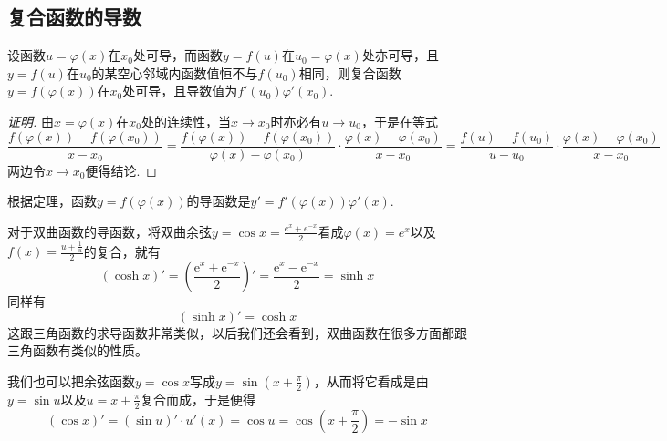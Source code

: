 \subsection{复合函数的导数}
\label{sec:derivative-of-embed-function}

\begin{theorem}
  设函数$u=\varphi(x)$在$x_0$处可导，而函数$y=f(u)$在$u_0=\varphi(x)$处亦可导，且$y=f(u)$在$u_0$的某空心邻域内函数值恒不与$f(u_0)$相同，则复合函数$y=f(\varphi(x))$在$x_0$处可导，且导数值为$f'(u_0)\varphi '(x_0)$.
\end{theorem}

\begin{proof}[证明]
  由$x=\varphi(x)$在$x_0$处的连续性，当$x \to x_0$时亦必有$u \to u_0$，于是在等式
  \[ \frac{f(\varphi(x))-f(\varphi(x_0))}{x-x_0} = \frac{f(\varphi(x))-f(\varphi(x_0))}{\varphi(x)-\varphi(x_0)} \cdot \frac{\varphi(x)-\varphi(x_0)}{x-x_0} = \frac{f(u)-f(u_0)}{u-u_0} \cdot \frac{\varphi(x)-\varphi(x_0)}{x-x_0} \]
  两边令$x \to x_0$便得结论.
\end{proof}

根据定理，函数$y=f(\varphi(x))$的导函数是$y'=f'(\varphi(x))\varphi '(x)$.

\begin{example}
  对于双曲函数的导函数，将双曲余弦$y=\cos{x}=\frac{e^x+e^{-x}}{2}$看成$\varphi(x)=e^x$以及$f(x)=\frac{u+\frac{1}{u}}{2}$的复合，就有
  \[ (\cosh{x})' = \left( \frac{\mathrm{e}^x+\mathrm{e}^{-x}}{2} \right)' = \frac{\mathrm{e}^x-\mathrm{e}^{-x}}{2} = \sinh{x} \]
  同样有
  \[ (\sinh{x})' = \cosh{x} \]
  这跟三角函数的求导函数非常类似，以后我们还会看到，双曲函数在很多方面都跟三角函数有类似的性质。
\end{example}

\begin{example}
  我们也可以把余弦函数$y=\cos{x}$写成$y=\sin{\left( x+\frac{\pi}{2} \right)}$，从而将它看成是由$y=\sin{u}$以及$u=x+\frac{\pi}{2}$复合而成，于是便得
  \[ (\cos{x})' = (\sin{u})' \cdot u'(x) = \cos{u} = \cos{\left( x+\frac{\pi}{2} \right)} = - \sin{x} \]
\end{example}

